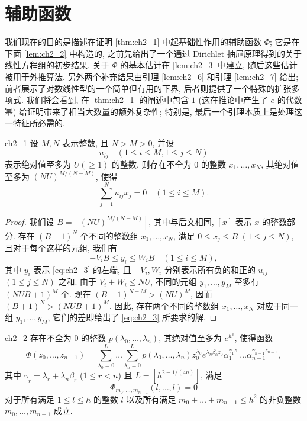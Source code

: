 \section{辅助函数}

我们现在的目的是描述在证明 \autoref{thm:ch2_1} 中起基础性作用的辅助函数 $\Phi$; 它是在下面 \autoref{lem:ch2_2} 中构造的, 之前先给出了一个通过 Dirichlet 抽屉原理得到的关于线性方程组的初步结果. 关于 $\Phi$ 的基本估计在 \autoref{lem:ch2_3} 中建立, 随后这些估计被用于外推算法. 另外两个补充结果由引理 \ref{lem:ch2_6} 和引理 \ref{lem:ch2_7} 给出; 前者展示了对数线性型的一个简单但有用的下界, 后者则提供了一个特殊的扩张多项式. 我们将会看到, 在 \autoref{thm:ch2_1} 的阐述中包含 $1$ (这在推论中产生了 $e$ 的代数幂) 给证明带来了相当大数量的额外复杂性; 特别是, 最后一个引理本质上是处理这一特征所必需的.

\begin{mylemma}{}{ch2_1}
设 $M, N$ 表示整数, 且 $N > M > 0$, 并设
\[
u_{ij} \quad (1 \le i \le M, 1 \le j \le N)
\]
表示绝对值至多为 $U (\ge 1)$ 的整数. 则存在不全为 $0$ 的整数 $x_1, \dots, x_N$, 其绝对值至多为 $(NU)^{M/(N-M)}$, 使得
\begin{equation} \label{eq:ch2_3}\tag{3}
\sum_{j=1}^N u_{ij} x_j = 0 \quad (1 \le i \le M).
\end{equation}
\end{mylemma}

\begin{proof}
我们设 $B = [(NU)^{M/(N-M)}]$, 其中与后文相同, $[x]$ 表示 $x$ 的整数部分. 存在 $(B+1)^N$ 个不同的整数组 $x_1, \dots, x_N$, 满足 $0 \le x_j \le B$ $(1 \le j \le N)$, 且对于每个这样的元组, 我们有
\[
-V_i B \le y_i \le W_i B \quad (1 \le i \le M),
\]
其中 $y_i$ 表示 \eqref{eq:ch2_3} 的左端, 且 $-V_i, W_i$ 分别表示所有负的和正的 $u_{ij}$ $(1 \le j \le N)$ 之和. 由于 $V_i + W_i \le NU$, 不同的元组 $y_1, \dots, y_M$ 至多有 $(NUB+1)^M$ 个. 现在 $(B+1)^{N-M} > (NU)^M$, 因而 $(B+1)^N > (NUB+1)^M$. 因此, 存在两个不同的整数组 $x_1, \dots, x_N$ 对应于同一组 $y_1, \dots, y_M$, 它们的差即给出了 \eqref{eq:ch2_3} 所要求的解.
\end{proof}

\begin{mylemma}{}{ch2_2}
存在不全为 $0$ 的整数 $p(\lambda_0, \dots, \lambda_n)$, 其绝对值至多为 $e^{h^3}$, 使得函数
\[
\Phi(z_0, \dots, z_{n-1}) = \sum_{\lambda_0=0}^L \dots \sum_{\lambda_n=0}^L p(\lambda_0, \dots, \lambda_n) z_0^{\lambda_0} e^{\lambda_n \beta_0 z_0} \alpha_1^{\gamma_1 z_1} \dots \alpha_{n-1}^{\gamma_{n-1} z_{n-1}},
\]
其中 $\gamma_r = \lambda_r + \lambda_n \beta_r$ ($1 \le r < n$) 且 $L = [h^{2-1/(4n)}]$, 满足
\begin{equation} \label{eq:ch2_4}\tag{4}
\Phi_{m_0, \dots, m_{n-1}}(l, \dots, l) = 0
\end{equation}
对于所有满足 $1 \le l \le h$ 的整数 $l$ 以及所有满足 $m_0 + \dots + m_{n-1} \le h^2$ 的非负整数 $m_0, \dots, m_{n-1}$ 成立.
\end{mylemma}

